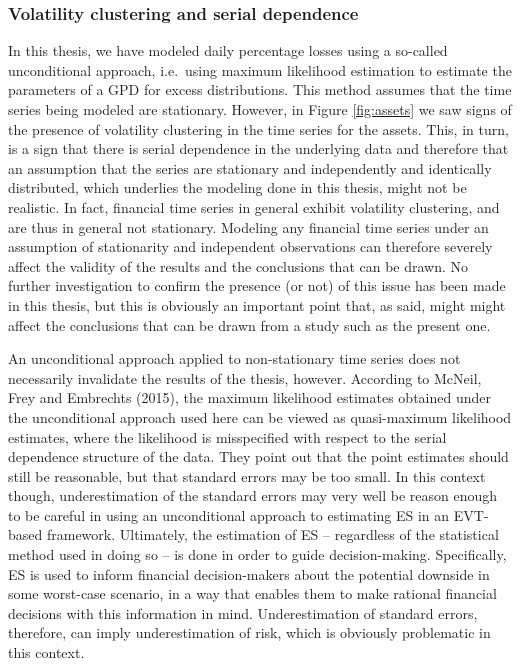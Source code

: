 \documentclass[a4paper,11pt]{article}
\theoremstyle{definition}
\theoremstyle{definition}
\theoremstyle{definition}
\theoremstyle{definition}
\theoremstyle{remark}
\begin{document}
\hypertarget{volatility-clustering-and-serial-dependence}{%
\subsubsection{Volatility clustering and serial dependence}\label{volatility-clustering-and-serial-dependence}}

In this thesis, we have modeled daily percentage losses using a so-called unconditional approach, i.e.~using maximum likelihood estimation to estimate the parameters of a GPD for excess distributions. This method assumes that the time series being modeled are stationary. However, in Figure \ref{fig:assets} we saw signs of the presence of volatility clustering in the time series for the assets. This, in turn, is a sign that there is serial dependence in the underlying data and therefore that an assumption that the series are stationary and independently and identically distributed, which underlies the modeling done in this thesis, might not be realistic. In fact, financial time series in general exhibit volatility clustering, and are thus in general not stationary. Modeling any financial time series under an assumption of stationarity and independent observations can therefore severely affect the validity of the results and the conclusions that can be drawn. No further investigation to confirm the presence (or not) of this issue has been made in this thesis, but this is obviously an important point that, as said, might might affect the conclusions that can be drawn from a study such as the present one.

An unconditional approach applied to non-stationary time series does not necessarily invalidate the results of the thesis, however. According to McNeil, Frey and Embrechts (2015), the maximum likelihood estimates obtained under the unconditional approach used here can be viewed as quasi-maximum likelihood estimates, where the likelihood is misspecified with respect to the serial dependence structure of the data. They point out that the point estimates should still be reasonable, but that standard errors may be too small. In this context though, underestimation of the standard errors may very well be reason enough to be careful in using an unconditional approach to estimating ES in an EVT-based framework. Ultimately, the estimation of ES -- regardless of the statistical method used in doing so -- is done in order to guide decision-making. Specifically, ES is used to inform financial decision-makers about the potential downside in some worst-case scenario, in a way that enables them to make rational financial decisions with this information in mind. Underestimation of standard errors, therefore, can imply underestimation of risk, which is obviously problematic in this context.
\end{document}

